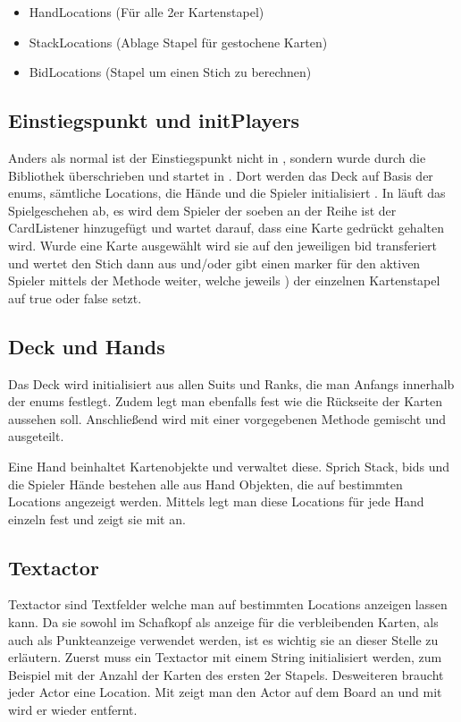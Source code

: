 \begin{itemize}
\item HandLocations (Für alle 2er Kartenstapel)
\item StackLocations (Ablage Stapel für gestochene Karten)
\item BidLocations (Stapel um einen Stich zu berechnen)
\end{itemize}

\subsection{Einstiegspunkt und initPlayers}

Anders als normal ist der Einstiegspunkt nicht in , sondern wurde
durch die Bibliothek überschrieben und startet in . Dort werden das Deck
auf Basis der enums, sämtliche Locations, die Hände und die Spieler
initialisiert . In  läuft das Spielgeschehen ab, es wird dem
Spieler der soeben an der Reihe ist der CardListener hinzugefügt und
 wartet darauf, dass eine Karte gedrückt gehalten wird.
Wurde eine Karte ausgewählt wird sie auf den jeweiligen bid transferiert und
 wertet den Stich dann aus und/oder gibt einen marker für den aktiven
Spieler mittels der Methode  weiter, welche jeweils
) der einzelnen Kartenstapel auf true oder false setzt.

\subsection{Deck und Hands}

Das Deck wird initialisiert aus allen Suits und Ranks, die man Anfangs innerhalb
der enums festlegt. Zudem legt man ebenfalls fest wie die Rückseite der Karten
aussehen soll. Anschließend wird mit einer vorgegebenen Methode gemischt und
ausgeteilt.


Eine Hand beinhaltet Kartenobjekte und verwaltet diese. Sprich Stack, bids und
die Spieler Hände bestehen alle aus Hand Objekten, die auf bestimmten Locations
angezeigt werden. Mittels  legt man diese Locations für jede Hand
einzeln fest und zeigt sie mit  an.

\subsection{Textactor}

Textactor sind Textfelder welche man auf bestimmten Locations anzeigen lassen
kann. Da sie sowohl im Schafkopf als anzeige für die verbleibenden Karten, als
auch als Punkteanzeige verwendet werden, ist es wichtig sie an dieser Stelle zu
erläutern. Zuerst muss ein Textactor mit einem String initialisiert werden, zum Beispiel mit der Anzahl der Karten des ersten 2er Stapels. Desweiteren
braucht jeder Actor eine Location. Mit  zeigt man
den Actor auf dem Board an und mit  wird er wieder
entfernt.

